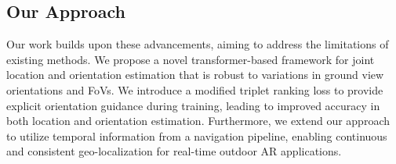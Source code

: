 \subsection{Our Approach}

Our work builds upon these advancements, aiming to address the limitations of existing methods. We propose a novel transformer-based framework for joint location and orientation estimation that is robust to variations in ground view orientations and FoVs. We introduce a modified triplet ranking loss to provide explicit orientation guidance during training, leading to improved accuracy in both location and orientation estimation. Furthermore, we extend our approach to utilize temporal information from a navigation pipeline, enabling continuous and consistent geo-localization for real-time outdoor AR applications.